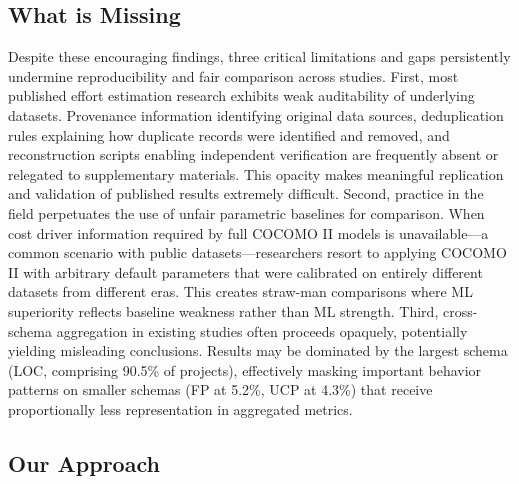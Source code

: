 \documentclass[11pt,a4paper]{article}
\begin{document}
\subsection{What is Missing}

Despite these encouraging findings, three critical limitations and gaps persistently undermine reproducibility and fair comparison across studies. First, most published effort estimation research exhibits weak auditability of underlying datasets. Provenance information identifying original data sources, deduplication rules explaining how duplicate records were identified and removed, and reconstruction scripts enabling independent verification are frequently absent or relegated to supplementary materials. This opacity makes meaningful replication and validation of published results extremely difficult. Second, practice in the field perpetuates the use of unfair parametric baselines for comparison. When cost driver information required by full COCOMO II models is unavailable---a common scenario with public datasets---researchers resort to applying COCOMO II with arbitrary default parameters that were calibrated on entirely different datasets from different eras. This creates straw-man comparisons where ML superiority reflects baseline weakness rather than ML strength. Third, cross-schema aggregation in existing studies often proceeds opaquely, potentially yielding misleading conclusions. Results may be dominated by the largest schema (LOC, comprising 90.5\% of projects), effectively masking important behavior patterns on smaller schemas (FP at 5.2\%, UCP at 4.3\%) that receive proportionally less representation in aggregated metrics.

\subsection{Our Approach}
\end{document}
